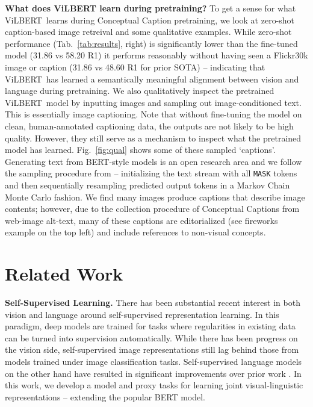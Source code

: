 \textbf{What does ViLBERT learn during pretraining?} To get a sense for what ViLBERT~learns during Conceptual Caption pretraining, we look at zero-shot caption-based image retreival and some qualitative examples. While zero-shot performance (Tab.~\ref{tab:results}, right) is significantly lower than the fine-tuned model (31.86 vs 58.20 R1) it performs reasonably without having seen a Flickr30k image or caption (31.86 vs 48.60 R1 for prior SOTA) -- indicating that ViLBERT~has learned a semantically meaningful alignment between vision and language during pretraining. We also qualitatively inspect the pretrained ViLBERT~model by inputting images and sampling out image-conditioned text. This is essentially image captioning. Note that without fine-tuning the model on clean, human-annotated captioning data, the outputs are not likely to be high quality. However, they still serve as a mechanism to inspect what the pretrained model has learned. Fig.~\ref{fig:qual} shows some of these sampled `captions'. Generating text from BERT-style models is an open research area and we follow the sampling procedure from \cite{wang2019bert} -- initializing the text stream with all \texttt{MASK} tokens and then sequentially resampling predicted output tokens in a Markov Chain Monte Carlo fashion. We find many images produce captions that describe image contents; however, due to the collection procedure of Conceptual Captions from web-image alt-text, many of these captions are editorialized (see fireworks example on the top left) and include references to non-visual concepts. 

\section{Related Work}
\label{sec:relwork}
\textbf{Self-Supervised Learning.} There has been substantial recent interest in both vision \cite{doersch2015unsupervised,zhang2016colorful,dosovitskiy2015discriminative,pathak2016context,jayaraman2015learning,misra2016shuffle} and language around self-supervised representation learning. In this paradigm, deep models are trained for tasks where regularities in existing data can be turned into supervision automatically. While there has been progress on the vision side, self-supervised image representations still lag behind those from models trained under image classification tasks. Self-supervised language models on the other hand have resulted in significant improvements over prior work \cite{devlin2018bert, radford2018improving, peters2018elmo,lample2019cross}. In this work, we develop a model and proxy tasks for learning joint visual-linguistic representations -- extending the popular BERT \cite{devlin2018bert} model.

